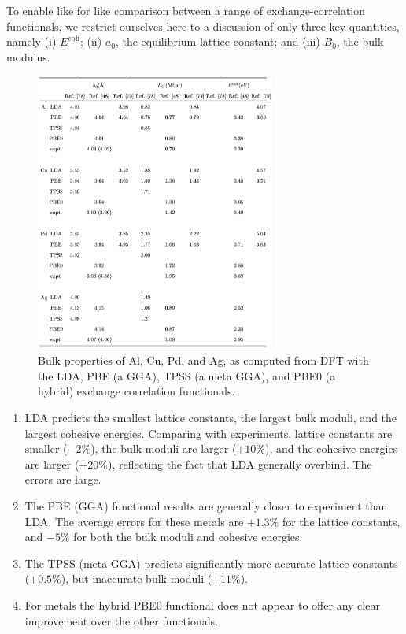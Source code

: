 \documentclass{article}
\theoremstyle{plain}\theoremheaderfont{\normalfont\itshape}\theorembodyfont{\rmfamily}\theoremseparator{.}\newtheorem*{rem}{Remark}\newtheorem*{ex}{Example}\newtheorem*{proof}{Proof}\newtheorem*{altp}{Alternative proof}
\theoremstyle{plain}\theoremheaderfont{\normalfont\bfseries}\theorembodyfont{\rmfamily}\theoremseparator{.}\newtheorem{thm}{Theorem}[section]\newtheorem{lem}[thm]{Lemma}\newtheorem{prop}[thm]{Proposition}\newtheorem*{cor}{Corollary}\newtheorem{defn}[thm]{Definition}\newtheorem{clm}[thm]{Claim}\newtheorem{clminproof}{Claim}\newtheorem{pos}{Postulate}[section]
\theoremstyle{break}\theoremheaderfont{\normalfont\itshape}\theorembodyfont{\rmfamily}\theoremseparator{.\medskip}\newtheorem*{proofskip}{Proof}\newtheorem*{exs}{Examples}\newtheorem*{rems}{Remarks}
\theoremstyle{break}\theoremheaderfont{\normalfont\bfseries}\theorembodyfont{\rmfamily}\theoremseparator{.\medskip}\newtheorem{lemskip}[thm]{Lemma}\newtheorem{defnskip}[thm]{Definition}\newtheorem{propskip}[thm]{Proposition}\newtheorem{thmskip}[thm]{Theorem}
\numberwithin{equation}{section}
\begin{document}
    To enable like for like comparison between a range of exchange-correlation functionals, we restrict ourselves here to a discussion of only three key quantities, namely (i) \(E^{\text{coh}}\); (ii) \(a_0\), the equilibrium lattice constant; and (iii) \(B_0\), the bulk modulus.

    \begin{figure}
        \centering
        \includegraphics[width=0.7\textwidth]{condensed.png}
        \caption{Bulk properties of Al, Cu, Pd, and Ag, as computed from DFT with the LDA, PBE (a GGA), TPSS (a meta GGA), and PBE0 (a hybrid) exchange correlation functionals.}
    \end{figure}

    \begin{enumerate}[topsep=0pt,label=(\roman*)]
        \item LDA predicts the smallest lattice constants, the largest bulk moduli, and the largest cohesive energies. Comparing with experiments, lattice constants are smaller (\(-2\%\)), the bulk moduli are larger (\(+10\%\)), and the cohesive energies are larger (\(+20\%\)), reflecting the fact that LDA generally overbind. The errors are large.
        \item The PBE (GGA) functional results are generally closer to experiment than LDA. The average errors for these metals are \(+1.3\%\) for the lattice constants, and \(-5\%\) for both the bulk moduli and cohesive energies.
        \item The TPSS (meta-GGA) predicts significantly more accurate lattice constants (\(+0.5\%\)), but inaccurate bulk moduli (\(+11\%\)).
        \item For metals the hybrid PBE0 functional does not appear to offer any clear improvement over the other functionals.
    \end{enumerate}
\end{document}
